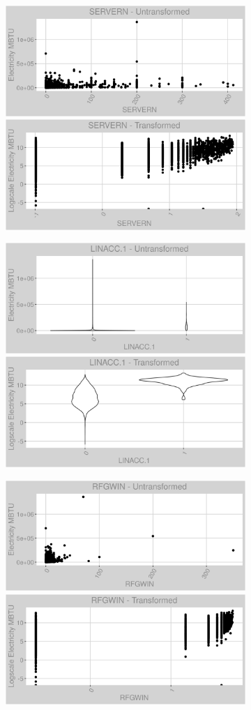 \FloatBarrier
\newpage
\begin{figure}
\centering
\begin{subfigure}{1\textwidth}
\centering
\includegraphics[width=.49\textwidth, height=0.3\textheight]{Images/electricity_var_original_15.png}
\includegraphics[width=.49\textwidth, height=0.3\textheight]{Images/electricity_var_transformed_15.png}
\end{subfigure}
\begin{subfigure}{1\textwidth}
\centering
\includegraphics[width=.49\textwidth, height=0.3\textheight]{Images/electricity_var_original_16.png}
\includegraphics[width=.49\textwidth, height=0.3\textheight]{Images/electricity_var_transformed_16.png}
\end{subfigure}
\begin{subfigure}{1\textwidth}
\centering
\includegraphics[width=.49\textwidth, height=0.3\textheight]{Images/electricity_var_original_17.png}
\includegraphics[width=.49\textwidth, height=0.3\textheight]{Images/electricity_var_transformed_17.png}
\end{subfigure}
\end{figure}
